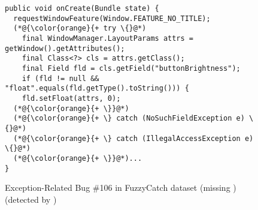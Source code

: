\begin{figure}[t]%
	\centering
\begin{lstlisting}[]
public void onCreate(Bundle state) {
  requestWindowFeature(Window.FEATURE_NO_TITLE);
  (*@{\color{orange}{+ try \{}@*)
    final WindowManager.LayoutParams attrs = getWindow().getAttributes();
    final Class<?> cls = attrs.getClass();
    final Field fld = cls.getField("buttonBrightness");
    if (fld != null && "float".equals(fld.getType().toString())) {
    fld.setFloat(attrs, 0);
  (*@{\color{orange}{+ \}}@*)
  (*@{\color{orange}{+ \} catch (NoSuchFieldException e) \{}@*)
  (*@{\color{orange}{+ \} catch (IllegalAccessException e) \{}@*)
  (*@{\color{orange}{+ \}}@*)...
}
\end{lstlisting}
        \vspace{-16pt}
        \caption{Exception-Related Bug \#106 in FuzzyCatch dataset (missing ) (detected by {\tool})}
        \label{fig:example-bug}
\end{figure}
